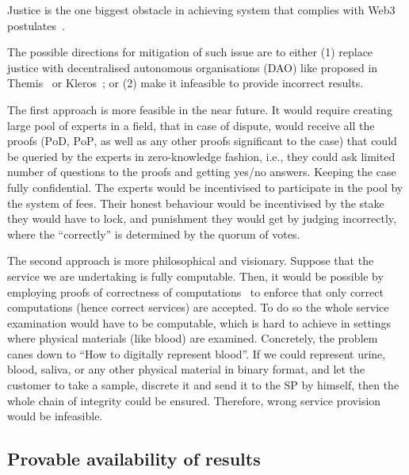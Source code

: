 \documentclass{ieeeaccess}
\begin{document}
Justice is the one biggest obstacle in achieving system that complies with Web3 postulates~\cite{Web3Wiki71}.

The possible directions for mitigation of such issue are to either (1) replace justice with decentralised autonomous organisations (DAO) like proposed in Themis~\cite{meng2019themis} or Kleros~\cite{lesaege2018kleros}; or (2) make it infeasible to provide incorrect results.

The first approach is more feasible in the near future. It would require creating large pool of experts in a field, that in case of dispute, would receive all the proofs ($\mathrm{PoD}$, $\mathrm{PoP}$, as well as any other proofs significant to the case) that could be queried by the experts in zero-knowledge fashion, i.e., they could ask limited number of questions to the proofs and getting yes/no answers. Keeping the case fully confidential. The experts would be incentivised to participate in the pool by the system of fees. Their honest behaviour would be incentivised by the stake they would have to lock, and punishment they would get by judging incorrectly, where the ``correctly'' is determined by the quorum of votes.

The second approach is more philosophical and visionary. Suppose that the service we are undertaking is fully computable. Then, it would be possible by employing proofs of correctness of computations~\cite{ben2013snarks} to enforce that only correct computations (hence correct services) are accepted. To do so the whole service examination would have to be computable, which is hard to achieve in settings where physical materials (like blood) are examined. Concretely, the problem canes down to ``How to digitally represent blood''. If we could represent urine, blood, saliva, or any other physical material in binary format, and let the customer to take a sample, discrete it and send it to the SP by himself, then the whole chain of integrity could be ensured. Therefore, wrong service provision would be infeasible.


\subsection{Provable availability of
results}\label{cryptographically-provable-availability-of-results}
\end{document}
